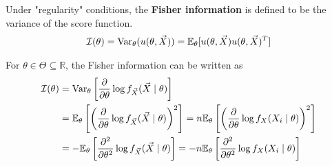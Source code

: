 \documentclass[11pt]{elegantbook}
\begin{document}
\begin{definition}
    \normalfont
    Under "regularity" conditions, the \textbf{Fisher information} is defined to be the variance of the score function.
    \begin{equation}
        \begin{aligned}
            \mathcal{I}(\theta)=\textnormal{Var}_\theta(u(\theta,\vec{X}))=\mathbb{E}_\theta[u(\theta,\vec{X})u(\theta,\vec{X})^T]
        \end{aligned}
        \nonumber
    \end{equation}
\end{definition}
\begin{lemma}
    For $\theta\in\Theta\subseteq \mathbb{R}$, the Fisher information can be written as
    \begin{equation}
        \begin{aligned}
            \mathcal{I}(\theta)&=\textnormal{Var}_\theta\left[\frac{\partial}{\partial \theta}\log f_{\vec{X}}(\vec{X}\mid\theta)\right]\\
            &=\mathbb{E}_\theta\left[\left(\frac{\partial}{\partial \theta}\log f_{\vec{X}}(\vec{X}\mid\theta)\right)^2\right]=n\mathbb{E}_\theta\left[\left(\frac{\partial}{\partial \theta}\log f_X(X_i\mid\theta)\right)^2\right]\\
            &=-\mathbb{E}_\theta\left[\frac{\partial^2}{\partial \theta^2}\log f_{\vec{X}}(\vec{X}\mid\theta)\right]=-n\mathbb{E}_\theta\left[\frac{\partial^2}{\partial \theta^2}\log f_X(X_i\mid\theta)\right]
        \end{aligned}
        \nonumber
    \end{equation}
\end{lemma}
\end{document}
